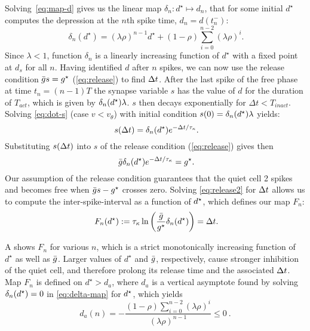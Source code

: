\documentclass[../manuscript.tex]{subfiles}
\begin{document}
Solving~\eqref{eq:map-d} gives us the linear map $\delta_{n}:d^{\star}\mapsto
d_{n}$, that for some initial $d^{\star}$ computes the depression at the $n$th
spike time, $d_{n}=d(t_{n}^{-})$:
\begin{equation}
  ~\label{eq:delta-map}
  \delta_{n}(d^{\star}) = (\lambda \rho)^{n-1} d^{\star} + (1-\rho)\sum_{i=0}^{n-2}(\lambda \rho)^{i}.
\end{equation}
Since $\lambda < 1$, function $\delta_{n}$ is a linearly increasing function of
$d^{\star}$ with a fixed point at $d_{s}$ for all $n$.  Having identified $d$ after $n$
spikes, we can now use the release condition $\bar g s = g^{\star}$ (\cref{eq:release}) to
find $\Delta t$.
After the last spike of the free phase at time $t_{n} = (n-1)T$ the synapse variable $s$
has the value of $d$ for the duration of $T_{act}$, which is given by
$\delta_n(d^\star)\lambda$. $s$ then decays exponentially for $\Delta t < T_{inact}$.
Solving \cref{eq:dot-s} (case $v < v_\theta$) with initial condition
$s(0)=\delta_n(d^\star)\lambda$ yields:
\begin{equation}
  ~\label{eq:s-sol}
  s(\Delta t)=\delta_n(d^\star)e^{-\Delta t/\tau_\kappa}.
\end{equation}
Substituting $s(\Delta t)$ into $s$ of the release condition (\cref{eq:release})
gives then
\begin{equation}
  ~\label{eq:release2}
  \bar g \delta_n(d^\star) e^{-\Delta t/\tau_\kappa}=g^{\star}.
\end{equation}
Our assumption of the release condition guarantees that the quiet cell 2 spikes and
becomes free when $\bar g s - g^{\star}$ crosses zero. Solving \cref{eq:release2} for
$\Delta t$ allows us to compute the inter-spike-interval as a function of $d^\star$, which
defines our map $F_n$:
\begin{equation}
  ~\label{eq:Fn-map}
  F_{n}(d^{\star}):=\tau_\kappa \ln{\left(\frac{\bar g}{g^{\star}} \delta_{n}(d^{\star})\right)}= \Delta t.
\end{equation}

A shows $F_n$ for various $n$, which is a strict monotonically increasing
function of $d^{\star}$ as well as $\bar g$.  Larger values of $d^{\star}$ and $\bar g$,
respectively, cause stronger inhibition of the quiet cell, and therefore prolong its
release time and the associated $\Delta t$.  Map $F_{n}$ is defined on $d^{\star}>d_{a}$,
where $d_{a}$ is a vertical asymptote found by solving $\delta_{n}(d^\star)=0$ in
\cref{eq:delta-map} for $d^\star$, which yields
\begin{equation}
  d_{a}(n)=-\frac{(1-\rho)\sum_{i=0}^{n-2}(\lambda \rho)^{i}}{ (\lambda \rho)^{n-1} }\leq 0~\label{eq:da}.
\end{equation}
\end{document}
